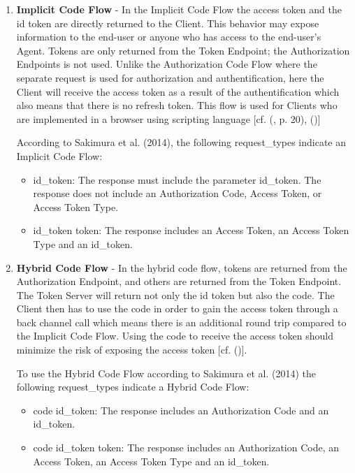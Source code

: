 {{\begin{enumerate}
			To use the Authorization Code Flow according to Sakimura et al. (2014) the following request\_type indicates a Authorization Code Flow:
			\begin{itemize}
				\item	code: The response includes an Authorization Code. 
			\end{itemize}
			
			\item \textbf{Implicit Code Flow} - In the Implicit Code Flow the access token and the id token are directly returned to the Client. This behavior may expose information to the end-user or anyone who has access to the end-user’s Agent. Tokens are only returned from the Token Endpoint; the Authorization Endpoints is not used. Unlike the Authorization Code Flow where the separate request is used for authorization and authentification, here the Client will receive the access token as a result of the authentification which also means that there is no refresh token.  This flow is used for Clients who are implemented in a browser using scripting language [cf. (\cite{Sakimura:2014:OpenIDConnect}, p. 20), (\cite{Hardt:2012:OAuth2})]
			
			According to Sakimura et al. (2014), the following request\_types indicate an Implicit Code Flow:
			\begin{itemize}
				\item	id\_token: The response must include the parameter id\_token. The response does not include an Authorization Code, Access Token, or Access Token Type. 
				\item  id\_token token: The response includes an Access Token, an Access Token Type and an id\_token.
			\end{itemize}
			
			\item \textbf{Hybrid Code Flow} - In the hybrid code flow, tokens are returned from the Authorization Endpoint, and others are returned from the Token Endpoint. The Token Server will return not only the id token but also the code. The Client then has to use the code in order to gain the access token through a back channel call which means there is an additional round trip compared to the Implicit Code Flow. Using the code to receive the access token should minimize the risk of exposing the access token [cf. (\cite{Sakimura:2014:OpenIDConnect})].
			
			To use the Hybrid Code Flow according to Sakimura et al. (2014) the following request\_types indicate a Hybrid Code Flow:
			\begin{itemize}
				\item	code id\_token: The response includes an Authorization Code and an id\_token.
				\item  code id\_token token: The response includes an Authorization Code, an Access Token, an Access Token Type and an id\_token. 
			\end{itemize} 
			

\end{enumerate}}}
